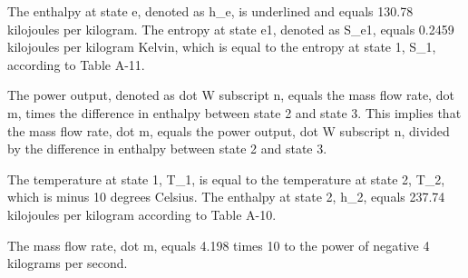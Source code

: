 The enthalpy at state e, denoted as h_e, is underlined and equals 130.78 kilojoules per kilogram. The entropy at state e1, denoted as S_e1, equals 0.2459 kilojoules per kilogram Kelvin, which is equal to the entropy at state 1, S_1, according to Table A-11.

The power output, denoted as dot W subscript n, equals the mass flow rate, dot m, times the difference in enthalpy between state 2 and state 3. This implies that the mass flow rate, dot m, equals the power output, dot W subscript n, divided by the difference in enthalpy between state 2 and state 3.

The temperature at state 1, T_1, is equal to the temperature at state 2, T_2, which is minus 10 degrees Celsius. The enthalpy at state 2, h_2, equals 237.74 kilojoules per kilogram according to Table A-10.

The mass flow rate, dot m, equals 4.198 times 10 to the power of negative 4 kilograms per second.
